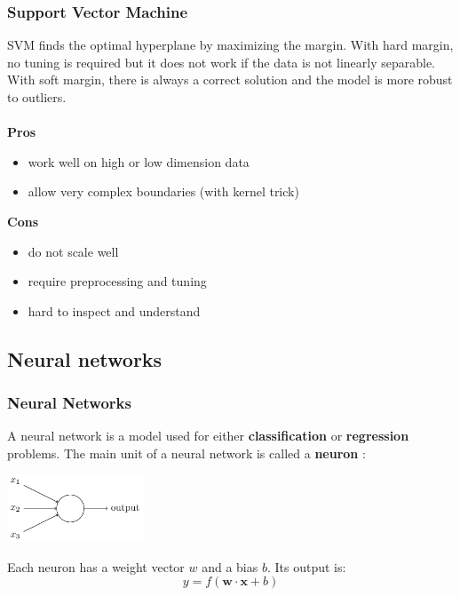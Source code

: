 \documentclass{beamer}
\begin{document}
\begin{frame}
  \frametitle{Support Vector Machine}
  SVM finds the optimal hyperplane by maximizing the margin. With hard margin,
  no tuning is required but it does not work if the data is not linearly
  separable. With soft margin, there is always a correct solution and the model
  is more robust to outliers.
  \\~\\
  \textbf{Pros}
  \begin{itemize}
    \item work well on high or low dimension data
    \item allow very complex boundaries (with kernel trick)
  \end{itemize}

  \textbf{Cons}
  \begin{itemize}
    \item do not scale well
    \item require preprocessing and tuning
    \item hard to inspect and understand
  \end{itemize}
\end{frame}

\subsection{Neural networks}
\begin{frame}
  \frametitle{Neural Networks}
  A neural network is a model used for either \textbf{classification} or
  \textbf{regression} problems. The main unit of a neural network is called a
  \textbf{neuron} :

  \begin{center}
    \includegraphics[height=2cm]{img/neuron.png}
  \end{center}

  Each neuron has a weight vector $w$ and a bias $b$. Its output is:
  \begin{equation}
    y = f(\boldsymbol{w} \cdot \boldsymbol{x} + b)
  \end{equation}
\end{frame}
\end{document}
